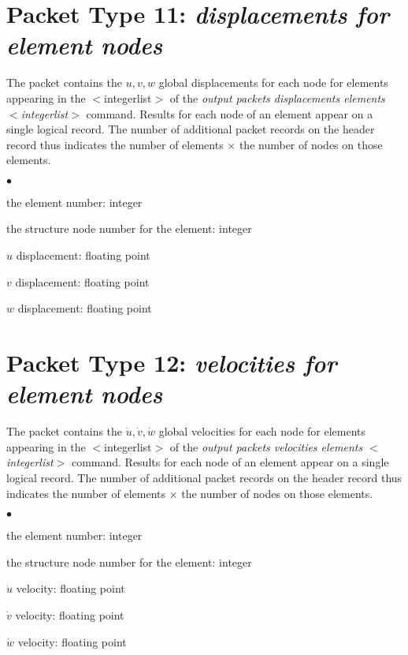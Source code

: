 \documentclass[10pt]{report}
\numberwithin{equation}{section}
\newcommand{\ti}{\emph}
\newcommand{\squishlist}{
 \begin{list}{$\bullet$}
  { \setlength{\itemsep}{0pt}
     \setlength{\parsep}{3pt}
     \setlength{\topsep}{3pt}
     \setlength{\partopsep}{0pt}
     \setlength{\leftmargin}{1.5em}
     \setlength{\labelwidth}{1em}
     \setlength{\labelsep}{0.5em} } }
\newcommand{\squishend}{
  \end{list}  }
\begin{document}
\section{Packet Type 11: \ti{displacements for element nodes}}
The packet contains the $u, v, w$ global displacements for each node 
for elements appearing in the $<$integerlist$>$ of the \ti{output 
packets displacements elements  $<$integerlist$>$ } command. 
Results for each node of an element appear on a single logical record. 
The number of additional packet records on the header record thus 
indicates the number of elements $\times$ the number of nodes on those elements.
\squishlist
\item the element number:  integer
\item the structure node number for the element:  integer
\item $u$ displacement:  floating point
\item $v$ displacement:  floating point
\item $w$ displacement:  floating point
\squishend

%
%
\section{Packet Type 12: \ti{velocities for element nodes}}
The packet contains the $\dot u, \dot v, \dot w$ global velocities for each node 
for elements appearing in the $<$integerlist$>$ of the \ti{output 
packets velocities elements  $<$integerlist$>$ } command. Results for 
each node of an element appear on a single logical record. The number 
of additional packet records on the header record thus indicates the 
number of elements $\times$ the number of nodes on those elements.
\squishlist
\item the element number:  integer
\item the structure node number for the element:  integer
\item $\dot u$ velocity:  floating point
\item $\dot v$ velocity:  floating point
\item $\dot w$ velocity:  floating point
\squishend

%
%
\end{document}

